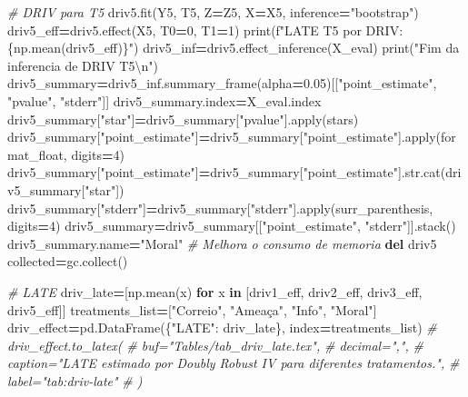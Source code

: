 \documentclass[
]{article}
\newenvironment{Shaded}{\begin{snugshade}}{\end{snugshade}}
\newcommand{\BuiltInTok}[1]{#1}
\newcommand{\CharTok}[1]{\textcolor[rgb]{0.31,0.60,0.02}{#1}}
\newcommand{\CommentTok}[1]{\textcolor[rgb]{0.56,0.35,0.01}{\textit{#1}}}
\newcommand{\ControlFlowTok}[1]{\textcolor[rgb]{0.13,0.29,0.53}{\textbf{#1}}}
\newcommand{\DecValTok}[1]{\textcolor[rgb]{0.00,0.00,0.81}{#1}}
\newcommand{\FloatTok}[1]{\textcolor[rgb]{0.00,0.00,0.81}{#1}}
\newcommand{\KeywordTok}[1]{\textcolor[rgb]{0.13,0.29,0.53}{\textbf{#1}}}
\newcommand{\NormalTok}[1]{#1}
\newcommand{\OperatorTok}[1]{\textcolor[rgb]{0.81,0.36,0.00}{\textbf{#1}}}
\newcommand{\SpecialCharTok}[1]{\textcolor[rgb]{0.00,0.00,0.00}{#1}}
\newcommand{\SpecialStringTok}[1]{\textcolor[rgb]{0.31,0.60,0.02}{#1}}
\newcommand{\StringTok}[1]{\textcolor[rgb]{0.31,0.60,0.02}{#1}}
\begin{document}
\begin{Shaded}
\begin{Highlighting}[]
{{\CommentTok{# DRIV para T5}
\NormalTok{driv5.fit(Y5, T5, Z}\OperatorTok{=}\NormalTok{Z5, X}\OperatorTok{=}\NormalTok{X5, inference}\OperatorTok{=}\StringTok{"bootstrap"}\NormalTok{)}
\NormalTok{driv5_eff}\OperatorTok{=}\NormalTok{driv5.effect(X5, T0}\OperatorTok{=}\DecValTok{0}\NormalTok{, T1}\OperatorTok{=}\DecValTok{1}\NormalTok{)}
\BuiltInTok{print}\NormalTok{(}\SpecialStringTok{f"LATE T5 por DRIV: }\SpecialCharTok{\{np.}\NormalTok{mean(driv5_eff)}\SpecialCharTok{\}}\SpecialStringTok{"}\NormalTok{)}
\NormalTok{driv5_inf}\OperatorTok{=}\NormalTok{driv5.effect_inference(X_eval)}
\BuiltInTok{print}\NormalTok{(}\StringTok{"Fim da inferencia de DRIV T5}\CharTok{\textbackslash{}n}\StringTok{"}\NormalTok{)}
\NormalTok{driv5_summary}\OperatorTok{=}\NormalTok{driv5_inf.summary_frame(alpha}\OperatorTok{=}\FloatTok{0.05}\NormalTok{)[[}\StringTok{"point_estimate"}\NormalTok{, }\StringTok{"pvalue"}\NormalTok{, }\StringTok{"stderr"}\NormalTok{]]}
\NormalTok{driv5_summary.index}\OperatorTok{=}\NormalTok{X_eval.index}
\NormalTok{driv5_summary[}\StringTok{"star"}\NormalTok{]}\OperatorTok{=}\NormalTok{driv5_summary[}\StringTok{"pvalue"}\NormalTok{].}\BuiltInTok{apply}\NormalTok{(stars)}
\NormalTok{driv5_summary[}\StringTok{"point_estimate"}\NormalTok{]}\OperatorTok{=}\NormalTok{driv5_summary[}\StringTok{"point_estimate"}\NormalTok{].}\BuiltInTok{apply}\NormalTok{(format_float, digits}\OperatorTok{=}\DecValTok{4}\NormalTok{)}
\NormalTok{driv5_summary[}\StringTok{"point_estimate"}\NormalTok{]}\OperatorTok{=}\NormalTok{driv5_summary[}\StringTok{"point_estimate"}\NormalTok{].}\BuiltInTok{str}\NormalTok{.cat(driv5_summary[}\StringTok{"star"}\NormalTok{])}
\NormalTok{driv5_summary[}\StringTok{"stderr"}\NormalTok{]}\OperatorTok{=}\NormalTok{driv5_summary[}\StringTok{"stderr"}\NormalTok{].}\BuiltInTok{apply}\NormalTok{(surr_parenthesis, digits}\OperatorTok{=}\DecValTok{4}\NormalTok{)}
\NormalTok{driv5_summary}\OperatorTok{=}\NormalTok{driv5_summary[[}\StringTok{"point_estimate"}\NormalTok{, }\StringTok{"stderr"}\NormalTok{]].stack()}
\NormalTok{driv5_summary.name}\OperatorTok{=}\StringTok{"Moral"}
\CommentTok{# Melhora o consumo de memoria}
\KeywordTok{del}\NormalTok{ driv5}
\NormalTok{collected}\OperatorTok{=}\NormalTok{gc.collect()}

\CommentTok{# LATE}
\NormalTok{driv_late}\OperatorTok{=}\NormalTok{[np.mean(x) }\ControlFlowTok{for}\NormalTok{ x }\KeywordTok{in} 
\NormalTok{    [driv1_eff, driv2_eff, driv3_eff, driv5_eff]]}
\NormalTok{treatments_list}\OperatorTok{=}\NormalTok{[}\StringTok{"Correio"}\NormalTok{, }\StringTok{"Ameaça"}\NormalTok{, }\StringTok{"Info"}\NormalTok{, }\StringTok{"Moral"}\NormalTok{]}
\NormalTok{driv_effect}\OperatorTok{=}\NormalTok{pd.DataFrame(\{}\StringTok{"LATE"}\NormalTok{: driv_late\}, index}\OperatorTok{=}\NormalTok{treatments_list)}
\CommentTok{# driv_effect.to_latex(}
\CommentTok{#     buf="Tables/tab_driv_late.tex",}
\CommentTok{#     decimal=",",}
\CommentTok{#     caption="LATE estimado por Doubly Robust IV para diferentes tratamentos.",}
\CommentTok{#     label="tab:driv-late"}
\CommentTok{# )}

}}
\end{Highlighting}
\end{Shaded}
\end{document}

